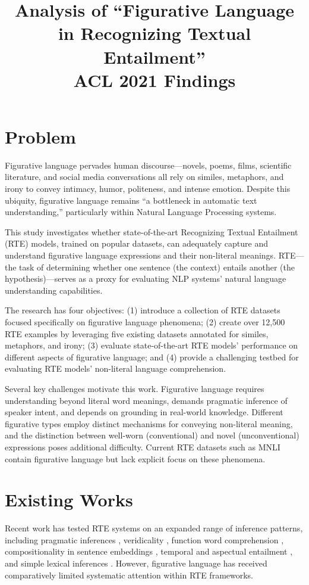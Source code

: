 \documentclass[12pt]{article}
\title{Analysis of ``Figurative Language in Recognizing Textual Entailment'' \\ \large ACL 2021 Findings}
\author{}
\date{}
\begin{document}
\maketitle

\section{Problem}

Figurative language pervades human discourse---novels, poems, films, scientific literature, and social media conversations all rely on similes, metaphors, and irony to convey intimacy, humor, politeness, and intense emotion. Despite this ubiquity, figurative language remains ``a bottleneck in automatic text understanding,'' particularly within Natural Language Processing systems.

This study investigates whether state-of-the-art Recognizing Textual Entailment (RTE) models, trained on popular datasets, can adequately capture and understand figurative language expressions and their non-literal meanings. RTE---the task of determining whether one sentence (the context) entails another (the hypothesis)---serves as a proxy for evaluating NLP systems' natural language understanding capabilities.

The research has four objectives: (1) introduce a collection of RTE datasets focused specifically on figurative language phenomena; (2) create over 12,500 RTE examples by leveraging five existing datasets annotated for similes, metaphors, and irony; (3) evaluate state-of-the-art RTE models' performance on different aspects of figurative language; and (4) provide a challenging testbed for evaluating RTE models' non-literal language comprehension.

Several key challenges motivate this work. Figurative language requires understanding beyond literal word meanings, demands pragmatic inference of speaker intent, and depends on grounding in real-world knowledge. Different figurative types employ distinct mechanisms for conveying non-literal meaning, and the distinction between well-worn (conventional) and novel (unconventional) expressions poses additional difficulty. Current RTE datasets such as MNLI contain figurative language but lack explicit focus on these phenomena.

\section{Existing Works}

Recent work has tested RTE systems on an expanded range of inference patterns, including pragmatic inferences \cite{jeretic2020}, veridicality \cite{ross2019}, function word comprehension \cite{kim2019}, compositionality in sentence embeddings \cite{dasgupta2018}, temporal and aspectual entailment \cite{kober2019}, and simple lexical inferences \cite{glockner2018}. However, figurative language has received comparatively limited systematic attention within RTE frameworks.
\end{document}
